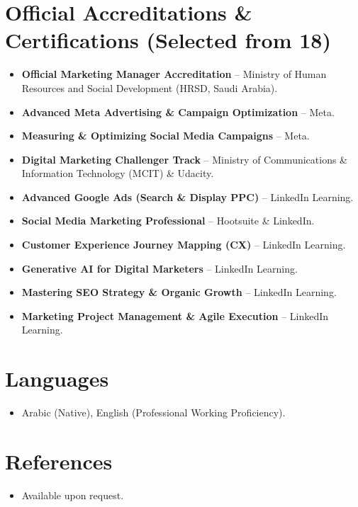 \documentclass[11pt,a4paper,sans]{moderncv}
\begin{document}
\section{Official Accreditations \& Certifications (Selected from 18)}
\vspace{1pt}
\begin{itemize}
\item{\textbf{Official Marketing Manager Accreditation} -- Ministry of Human Resources and Social Development (HRSD, Saudi Arabia).}
\item{\textbf{Advanced Meta Advertising \& Campaign Optimization} -- Meta.}
\item{\textbf{Measuring \& Optimizing Social Media Campaigns} -- Meta.}
\item{\textbf{Digital Marketing Challenger Track} -- Ministry of Communications \& Information Technology (MCIT) \& Udacity.}
\item{\textbf{Advanced Google Ads (Search \& Display PPC)} -- LinkedIn Learning.}
\item{\textbf{Social Media Marketing Professional} -- Hootsuite \& LinkedIn.}
\item{\textbf{Customer Experience Journey Mapping (CX)} -- LinkedIn Learning.}
\item{\textbf{Generative AI for Digital Marketers} -- LinkedIn Learning.}
\item{\textbf{Mastering SEO Strategy \& Organic Growth} -- LinkedIn Learning.}
\item{\textbf{Marketing Project Management \& Agile Execution} -- LinkedIn Learning.}
\end{itemize}


\section{Languages}
\vspace{1pt}
\begin{itemize}
\item {Arabic (Native), English (Professional Working Proficiency).}
\end{itemize}


\section{References}
\vspace{1pt}
\begin{itemize}
\item{Available upon request.}
\end{itemize}
\end{document}
